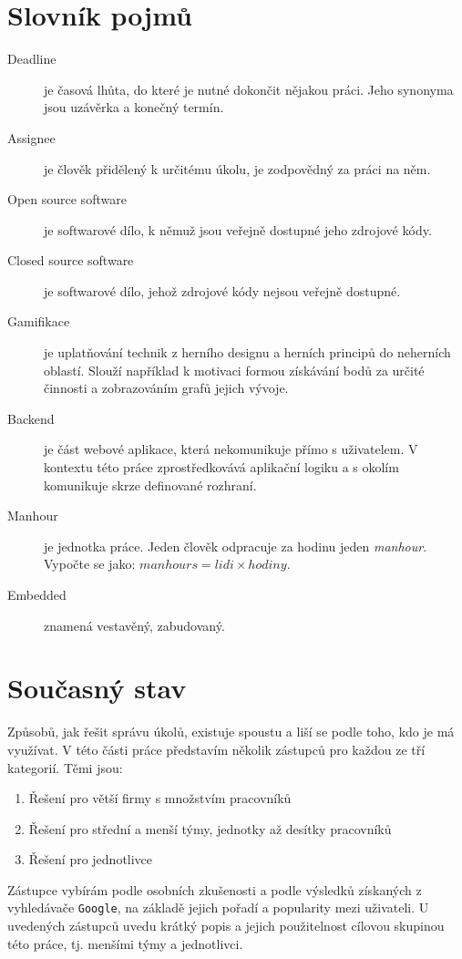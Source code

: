 \documentclass[thesis=B,czech]{FITthesis}[2012/06/26]
\begin{document}
\chapter{Slovník pojmů}
	\begin{description}
		\item[Deadline] je časová lhůta, do které je nutné dokončit nějakou práci. Jeho synonyma jsou uzávěrka a konečný termín.
		
		\item[Assignee] je člověk přidělený k určitému úkolu, je zodpovědný za práci na něm.
		\item[Open source software] je softwarové dílo, k němuž jsou veřejně dostupné jeho zdrojové kódy.
		\item[Closed source software] je softwarové dílo, jehož zdrojové kódy nejsou veřejně dostupné.
		\item[Gamifikace] je uplatňování technik z herního designu a herních principů do neherních oblastí. Slouží například k motivaci formou získávání bodů za určité činnosti a zobrazováním grafů jejich vývoje.
		\item[Backend] je část webové aplikace, která nekomunikuje přímo s uživatelem. V kontextu této práce zprostředkovává aplikační logiku a s okolím komunikuje skrze definované rozhraní.
		\item[Manhour] je jednotka práce. Jeden člověk odpracuje za hodinu jeden \textit{manhour}. Vypočte se jako: $manhours = lidi \times hodiny$.
		\item[Embedded] znamená vestavěný, zabudovaný. 
	\end{description}
\chapter{Současný stav}
	\label{chapter:current-state}

	Způsobů, jak řešit správu úkolů, existuje spoustu a liší se podle toho, kdo je má využívat. V této části práce představím několik zástupců pro každou ze tří kategorií. Těmi jsou:
	\begin{enumerate}
	  \item Řešení pro větší firmy s množstvím pracovníků
	  \item Řešení pro střední a menší týmy, jednotky až desítky pracovníků
	  \item Řešení pro jednotlivce
	\end{enumerate}

	Zástupce vybírám podle osobních zkušenosti a podle výsledků získaných z vyhledávače \texttt{Google}, na základě jejich pořadí a popularity mezi uživateli. U uvedených zástupců uvedu krátký popis a jejich použitelnost cílovou skupinou této práce, tj. menšími týmy a jednotlivci.
\end{document}
